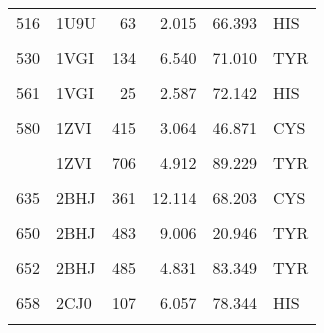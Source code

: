 \begin{table}
\begin{tabular}{llrrrl}
			516 & 1U9U & 63 & 2.015 & 66.393 & HIS\\
			\cellcolor{gray!6}{527} & \cellcolor{gray!6}{1VGI} & \cellcolor{gray!6}{114} & \cellcolor{gray!6}{10.625} & \cellcolor{gray!6}{53.936} & \cellcolor{gray!6}{TYR}\\
			530 & 1VGI & 134 & 6.540 & 71.010 & TYR\\
			\addlinespace
			\cellcolor{gray!6}{533} & \cellcolor{gray!6}{1VGI} & \cellcolor{gray!6}{137} & \cellcolor{gray!6}{7.705} & \cellcolor{gray!6}{77.807} & \cellcolor{gray!6}{TYR}\\
			561 & 1VGI & 25 & 2.587 & 72.142 & HIS\\
			\cellcolor{gray!6}{570} & \cellcolor{gray!6}{1VGI} & \cellcolor{gray!6}{58} & \cellcolor{gray!6}{10.081} & \cellcolor{gray!6}{74.439} & \cellcolor{gray!6}{TYR}\\
			580 & 1ZVI & 415 & 3.064 & 46.871 & CYS\\
			\cellcolor{gray!6}{599} & \cellcolor{gray!6}{1ZVI} & \cellcolor{gray!6}{588} & \cellcolor{gray!6}{8.761} & \cellcolor{gray!6}{51.436} & \cellcolor{gray!6}{TYR}\\
			\addlinespace
			610 & 1ZVI & 706 & 4.912 & 89.229 & TYR\\
			\cellcolor{gray!6}{620} & \cellcolor{gray!6}{2BHJ} & \cellcolor{gray!6}{194} & \cellcolor{gray!6}{2.661} & \cellcolor{gray!6}{52.816} & \cellcolor{gray!6}{CYS}\\
			635 & 2BHJ & 361 & 12.114 & 68.203 & CYS\\
			\cellcolor{gray!6}{641} & \cellcolor{gray!6}{2BHJ} & \cellcolor{gray!6}{367} & \cellcolor{gray!6}{8.780} & \cellcolor{gray!6}{48.571} & \cellcolor{gray!6}{TYR}\\
			650 & 2BHJ & 483 & 9.006 & 20.946 & TYR\\
			\addlinespace
			\cellcolor{gray!6}{651} & \cellcolor{gray!6}{2BHJ} & \cellcolor{gray!6}{484} & \cellcolor{gray!6}{10.510} & \cellcolor{gray!6}{86.316} & \cellcolor{gray!6}{TYR}\\
			652 & 2BHJ & 485 & 4.831 & 83.349 & TYR\\
			\cellcolor{gray!6}{656} & \cellcolor{gray!6}{2CJ0} & \cellcolor{gray!6}{105} & \cellcolor{gray!6}{4.893} & \cellcolor{gray!6}{56.765} & \cellcolor{gray!6}{HIS}\\
			658 & 2CJ0 & 107 & 6.057 & 78.344 & HIS\\
			\cellcolor{gray!6}{686} & \cellcolor{gray!6}{2CJ0} & \cellcolor{gray!6}{29} & \cellcolor{gray!6}{2.636} & \cellcolor{gray!6}{47.217} & \cellcolor{gray!6}{CYS}\\

\end{tabular}
\end{table}
